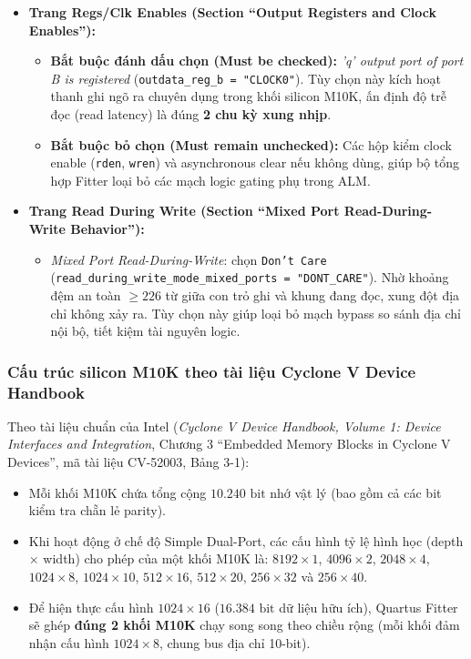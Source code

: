 \begin{itemize}[leftmargin=1.5em, itemsep=3pt]
    \item \textbf{Trang Regs/Clk Enables (Section ``Output Registers and Clock Enables''):}
    \begin{itemize}[leftmargin=1.2em, itemsep=2pt]
        \item \textbf{Bắt buộc đánh dấu chọn (Must be checked):} \emph{'q' output port of port B is registered} (\texttt{outdata\_reg\_b = "CLOCK0"}). Tùy chọn này kích hoạt thanh ghi ngõ ra chuyên dụng trong khối silicon M10K, ấn định độ trễ đọc (read latency) là đúng \textbf{2 chu kỳ xung nhịp}.
        \item \textbf{Bắt buộc bỏ chọn (Must remain unchecked):} Các hộp kiểm clock enable (\texttt{rden}, \texttt{wren}) và asynchronous clear nếu không dùng, giúp bộ tổng hợp Fitter loại bỏ các mạch logic gating phụ trong ALM.
    \end{itemize}
    
    \item \textbf{Trang Read During Write (Section ``Mixed Port Read-During-Write Behavior''):}
    \begin{itemize}[leftmargin=1.2em, itemsep=2pt]
        \item \emph{Mixed Port Read-During-Write}: chọn \texttt{Don't Care} (\texttt{read\_during\_write\_mode\_mixed\_ports = "DONT\_CARE"}). Nhờ khoảng đệm an toàn $\ge 226$ từ giữa con trỏ ghi và khung đang đọc, xung đột địa chỉ không xảy ra. Tùy chọn này giúp loại bỏ mạch bypass so sánh địa chỉ nội bộ, tiết kiệm tài nguyên logic.
    \end{itemize}
\end{itemize}

\subsubsection*{Cấu trúc silicon M10K theo tài liệu Cyclone V Device Handbook}
Theo tài liệu chuẩn của Intel (\emph{Cyclone V Device Handbook, Volume 1: Device Interfaces and Integration}, Chương 3 ``Embedded Memory Blocks in Cyclone V Devices'', mã tài liệu CV-52003, Bảng 3-1):
\begin{itemize}[leftmargin=1.5em, itemsep=2pt]
    \item Mỗi khối M10K chứa tổng cộng $10.240\text{ bit}$ nhớ vật lý (bao gồm cả các bit kiểm tra chẵn lẻ parity).
    \item Khi hoạt động ở chế độ Simple Dual-Port, các cấu hình tỷ lệ hình học (depth $\times$ width) cho phép của một khối M10K là: $8192 \times 1$, $4096 \times 2$, $2048 \times 4$, $1024 \times 8$, $1024 \times 10$, $512 \times 16$, $512 \times 20$, $256 \times 32$ và $256 \times 40$.
    \item Để hiện thực cấu hình $1024 \times 16$ ($16.384\text{ bit}$ dữ liệu hữu ích), Quartus Fitter sẽ ghép \textbf{đúng 2 khối M10K} chạy song song theo chiều rộng (mỗi khối đảm nhận cấu hình $1024 \times 8$, chung bus địa chỉ 10-bit).
\end{itemize}


